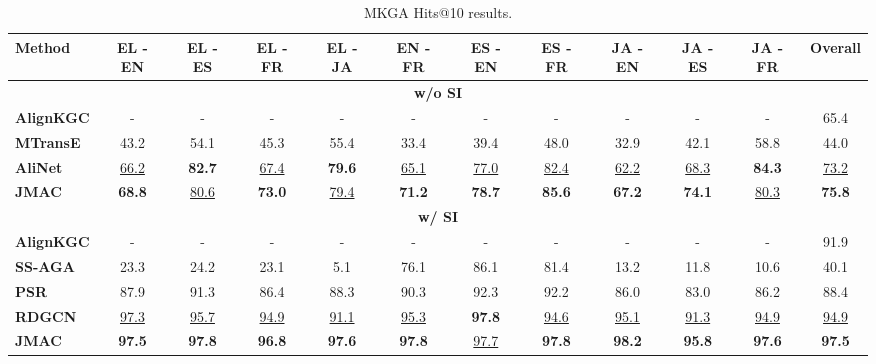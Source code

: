 \documentclass[11pt]{article}
\begin{document}
\begin{table*}[!t]
    \begin{adjustbox}{width=440pt,center}
    \centering
    \setlength{\tabcolsep}{0.3em}
    \begin{tabular}{l|c|c|c|c|c|c|c|c|c|c|c}
    \hline
    {\bf Method} & 
    \bf EL - EN & \bf EL - ES & \bf EL - FR & \bf EL - JA & \bf EN - FR & \bf ES - EN & \bf ES - FR & \bf JA - EN & \bf JA - ES & \bf JA - FR & \bf Overall \\
    \cline{2-12}
\hline
    \multicolumn{12}{c}{\textbf{w/o SI}} \\
    \hline
    \textbf{AlignKGC} & - & - & - & - & - & - & - & - & - & - & 65.4 \\
    \bf MTransE & 43.2 & 54.1 & 45.3 & 55.4 & 33.4 & 39.4 & 48.0 & 32.9 & 42.1 & 58.8 & 44.0 \\
    \bf AliNet & \underline{66.2} & \bf 82.7 & \underline{67.4} & \bf 79.6 & \underline{65.1} & \underline{77.0} & \underline{82.4} & \underline{62.2} & \underline{68.3} & \bf 84.3 & \underline{73.2} \\
    \textbf{JMAC} & \bf 68.8 & \underline{80.6} & \bf 73.0 & \underline{79.4} & \bf 71.2 & \bf 78.7 & \bf 85.6 & \bf 67.2 & \bf 74.1 & \underline{80.3} & \bf 75.8 \\
    \hline
    \multicolumn{12}{c}{\textbf{w/ SI}} \\
    \hline
    \textbf{AlignKGC} & - & - & - & - & - & - & - & - & - & - & 91.9 \\
    \bf SS-AGA & 23.3 & 24.2 & 23.1 & 5.1 & 76.1 & 86.1 & 81.4 & 13.2 & 11.8 & 10.6 & 40.1 \\
    \bf PSR & 87.9 & 91.3 & 86.4 & 88.3 & 90.3 & 92.3 & 92.2 & 86.0 & 83.0 & 86.2 & 88.4 \\
    \bf RDGCN & \underline{97.3} & \underline{95.7} & \underline{94.9} & \underline{91.1} & \underline{95.3} & \bf {97.8} & \underline{94.6} & \underline{95.1} & \underline{91.3} & \underline{94.9} & \underline{94.9} \\
    \textbf{JMAC} & \bf 97.5 & \bf 97.8 & \bf 96.8 & \bf 97.6 & \bf 97.8 & \underline{ 97.7} & \bf 97.8 & \bf 98.2 & \bf 95.8 & \bf 97.6 & \bf 97.5 \\
    \hline 
\end{tabular}
    \end{adjustbox}
    \caption{MKGA Hits@10 results.}
    \label{tab:end2end_kga_hits10}
\end{table*}
\end{document}
